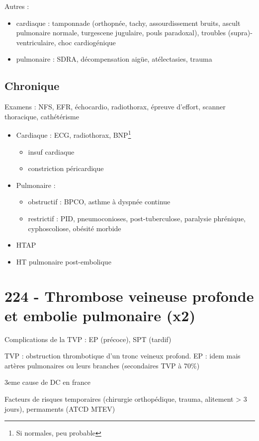 Autres :
\begin{itemize}
  \item cardiaque : tamponnade (orthopnée, tachy, assourdissement bruits, ascult
    pulmonaire normale, turgescene jugulaire, pouls paradoxal), troubles
    (supra)-ventriculaire, choc cardiogénique
  \item pulmonaire : SDRA, décompensation aigüe, atélectasies, trauma
\end{itemize}

\subsection{Chronique}
Examens : NFS, EFR, échocardio, radiothorax, épreuve d'effort, scanner thoracique,
cathétérisme

\begin{itemize}
\item Cardiaque : ECG, radiothorax, BNP\footnote{Si normales, peu probable}
    \begin{itemize}
      \item insuf cardiaque
      \item constriction péricardique
    \end{itemize}
  \item Pulmonaire :
    \begin{itemize}
      \item obstructif : BPCO, asthme à dyspnée continue
      \item restrictif : PID, pneumoconioses, post-tuberculose, paralysie phrénique,
        cyphoscoliose, obésité morbide
    \end{itemize}
  \item HTAP
  \item HT pulmonaire post-embolique
\end{itemize}

\section{224 - Thrombose veineuse profonde et embolie pulmonaire (x2)}%
\label{sec:224_thrombose_veineuse_profonde_et_embolie_pulmonaire}
Complications de la \gls{TVP} : \gls{EP} (précoce), \gls{SPT} (tardif)

TVP : obstruction thrombotique d'un tronc veineux profond. EP : idem mais
artères pulmonaires ou leurs branches (secondaires TVP à 70\%)

3eme cause de DC en france

Facteurs de risques temporaires (chirurgie orthopédique, trauma, alitement > 3
jours), permaments (ATCD \gls{MTEV})

